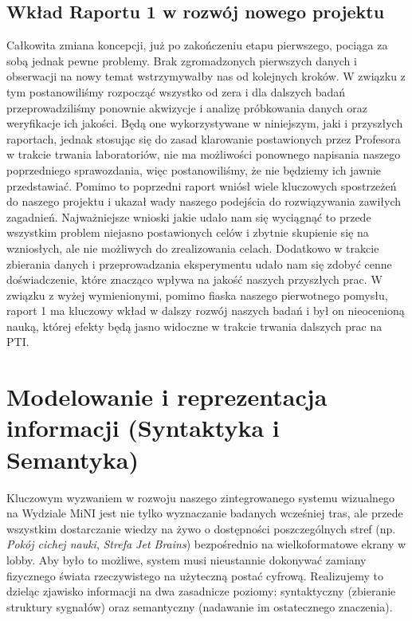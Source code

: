 \documentclass[14pt,a4paper]{extarticle}
\begin{document}
\subsection{Wkład Raportu 1 w rozwój nowego projektu}
Całkowita zmiana koncepcji, już po zakończeniu etapu pierwszego, pociąga za sobą jednak pewne problemy. Brak zgromadzonych pierwszych danych i obserwacji na nowy temat wstrzymywałby nas od kolejnych kroków. W związku z tym postanowiliśmy rozpocząć wszystko od zera i dla dalszych badań przeprowadziliśmy ponownie akwizycje i analizę próbkowania danych oraz weryfikacje ich jakości. Będą one wykorzystywane w niniejszym, jaki i przyszłych raportach, jednak stosując się do zasad klarowanie postawionych przez Profesora w trakcie trwania laboratoriów, nie ma możliwości ponownego napisania naszego poprzedniego sprawozdania, więc postanowiliśmy, że nie będziemy ich jawnie przedstawiać. Pomimo to poprzedni raport wniósł wiele kluczowych spostrzeżeń do naszego projektu i ukazał wady naszego podejścia do rozwiązywania zawiłych zagadnień. Najważniejsze wnioski jakie udało nam się wyciągnąć to przede wszystkim problem niejasno postawionych celów i zbytnie skupienie się na wzniosłych, ale nie możliwych do zrealizowania celach. Dodatkowo w trakcie zbierania danych i przeprowadzania eksperymentu udało nam się zdobyć cenne doświadczenie, które znacząco wpływa na jakość naszych przyszłych prac. W związku z wyżej wymienionymi, pomimo fiaska naszego pierwotnego pomysłu, raport 1 ma kluczowy wkład w dalszy rozwój naszych badań i był on nieocenioną nauką, której efekty będą jasno widoczne w trakcie trwania dalszych prac na PTI.

\section{Modelowanie i reprezentacja informacji (Syntaktyka i Semantyka)}

Kluczowym wyzwaniem w rozwoju naszego zintegrowanego systemu wizualnego na Wydziale MiNI jest nie tylko wyznaczanie badanych wcześniej tras, ale przede wszystkim dostarczanie wiedzy na żywo o dostępności poszczególnych stref (np. \textit{Pokój cichej nauki}, \textit{Strefa Jet Brains}) bezpośrednio na wielkoformatowe ekrany w lobby. Aby było to możliwe, system musi nieustannie dokonywać zamiany fizycznego świata rzeczywistego na użyteczną postać cyfrową. Realizujemy to dzieląc zjawisko informacji na dwa zasadnicze poziomy: syntaktyczny (zbieranie struktury sygnałów) oraz semantyczny (nadawanie im ostatecznego znaczenia).
\end{document}
